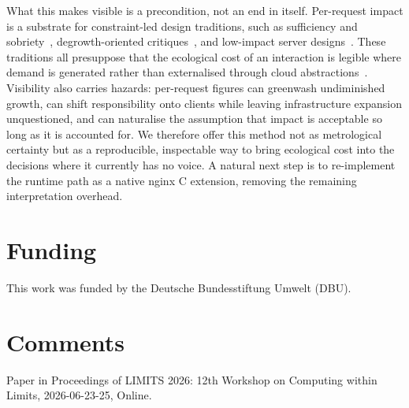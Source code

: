 \documentclass[sigconf]{acmart}
\begin{document}
What this makes visible is a precondition, not an end in itself. Per-request impact is a substrate for constraint-led design traditions, such as sufficiency and sobriety~\cite{pargman2014rethinking,nardi2018computingwithinlimits}, degrowth-oriented critiques~\cite{becker2023insolvent}, and low-impact server designs~\cite{dedecker2018solar}. These traditions all presuppose that the ecological cost of an interaction is legible where demand is generated rather than externalised through cloud abstractions~\cite{mytton2020hiding}. Visibility also carries hazards: per-request figures can greenwash undiminished growth, can shift responsibility onto clients while leaving infrastructure expansion unquestioned, and can naturalise the assumption that impact is acceptable so long as it is accounted for. We therefore offer this method not as metrological certainty but as a reproducible, inspectable way to bring ecological cost into the decisions where it currently has no voice. A natural next step is to re-implement the runtime path as a native nginx C extension, removing the remaining interpretation overhead.

\section*{Funding}
This work was funded by the Deutsche Bundesstiftung Umwelt (DBU).

\section*{Comments}
Paper in Proceedings of LIMITS
2026: 12th Workshop on Computing within Limits, 2026-06-23-25, Online.

\clearpage


\end{document}
